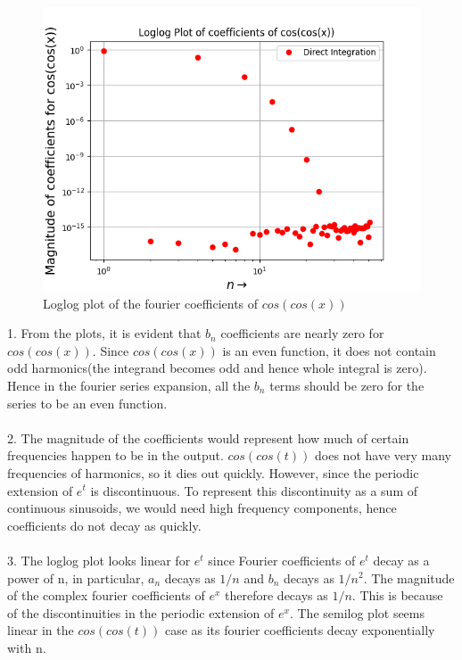 \documentclass[11pt, a4paper]{article}
\begin{document}
	\begin{figure}[!tbh]
   	\centering
   	\includegraphics[scale=0.5]{Ass4_Figure_6.png}   
   	\caption{Loglog plot of the fourier coefficients of $cos(cos(x))$}
   	\label{fig:sample}
   \end{figure} 
1. From the plots, it is evident that $b_n$ coefficients are nearly zero for $cos(cos(x))$. Since $cos(cos(x))$ is an even function, it does not contain odd harmonics(the integrand becomes odd and hence whole integral is zero). Hence in the fourier series expansion, all the $b_n$ terms should be zero for the series to be an even function.\\\\
2. The magnitude of the coefficients would represent how much of certain frequencies happen to be in the output. $cos(cos(t))$ does not have very many frequencies of harmonics, so it dies out quickly. However, since the periodic extension of $e^{t}$ is discontinuous. To represent this discontinuity as a sum of continuous sinusoids, we would need high frequency components, hence coefficients do not decay as quickly.\\\\
3. The loglog plot looks linear for $e^{t}$ since Fourier coefficients of $e^{t}$ decay as a power of n, in particular, $a_n$ decays as $1/n$ and $b_n$ decays as $1/n^{2}$. The magnitude of the complex fourier coefficients of $e^x$ therefore decays as $1/n$. This is because of the discontinuities in the periodic extension of $e^x$. The semilog plot seems linear in the $cos(cos(t))$ case as its fourier coefficients decay exponentially with n.
\end{document}
